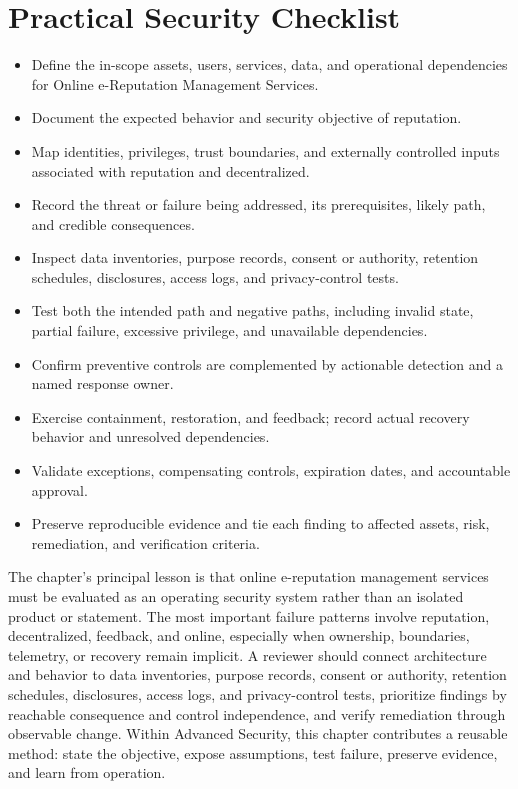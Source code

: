 \documentclass[11pt]{article}
\begin{document}
\section*{Practical Security Checklist}
\begin{itemize}[label=$\square$]
\item Define the in-scope assets, users, services, data, and operational dependencies for Online e-Reputation Management Services.
\item Document the expected behavior and security objective of reputation.
\item Map identities, privileges, trust boundaries, and externally controlled inputs associated with reputation and decentralized.
\item Record the threat or failure being addressed, its prerequisites, likely path, and credible consequences.
\item Inspect data inventories, purpose records, consent or authority, retention schedules, disclosures, access logs, and privacy-control tests.
\item Test both the intended path and negative paths, including invalid state, partial failure, excessive privilege, and unavailable dependencies.
\item Confirm preventive controls are complemented by actionable detection and a named response owner.
\item Exercise containment, restoration, and feedback; record actual recovery behavior and unresolved dependencies.
\item Validate exceptions, compensating controls, expiration dates, and accountable approval.
\item Preserve reproducible evidence and tie each finding to affected assets, risk, remediation, and verification criteria.
\end{itemize}
\begin{synthesisbox}
The chapter's principal lesson is that online e-reputation management services must be evaluated as an operating security system rather than an isolated product or statement. The most important failure patterns involve reputation, decentralized, feedback, and online, especially when ownership, boundaries, telemetry, or recovery remain implicit. A reviewer should connect architecture and behavior to data inventories, purpose records, consent or authority, retention schedules, disclosures, access logs, and privacy-control tests, prioritize findings by reachable consequence and control independence, and verify remediation through observable change. Within Advanced Security, this chapter contributes a reusable method: state the objective, expose assumptions, test failure, preserve evidence, and learn from operation.
\end{synthesisbox}
\end{document}
